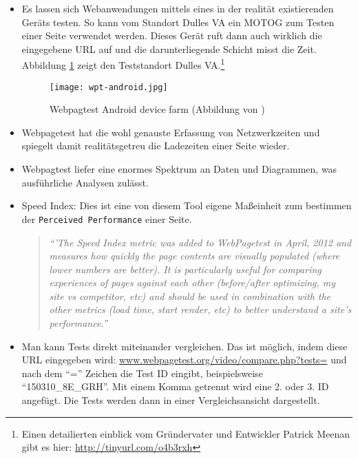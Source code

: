 			\begin{itemize}
				\item Es lassen sich Webanwendungen mittels eines in der realität existierenden Geräts testen. So kann vom Standort Dulles VA ein MOTOG zum Testen einer Seite verwendet werden. Dieses Gerät ruft dann auch wirklich die eingegebene URL auf und die darunterliegende Schicht misst die Zeit. Abbildung \ref{fig:wpt-android} zeigt den Teststandort Dulles VA.\footnote{Einen detailierten einblick vom Gründervater und Entwickler Patrick Meenan gibt es hier: \url{http://tinyurl.com/o4b3rxh}}

				\begin{figure}[htbp]
					\begin{center}
						\texttt{[image: wpt-android.jpg]}
						\caption{Webpagtest Android device farm (Abbildung von \autocite{meenan15})}
						\label{fig:wpt-android}
					\end{center}
				\end{figure}
				\item Webpagetest hat die wohl genauste Erfassung von Netzwerkzeiten und spiegelt damit realitätsgetreu die Ladezeiten einer Seite wieder.

				\item Webpagtest liefer eine enormes Spektrum an Daten und Diagrammen, was ausführliche Analysen zulässt.

				\item Speed Index: Dies ist eine von diesem Tool eigene Maßeinheit zum bestimmen der \texttt{Perceived Performance} einer Seite.

				\begin{quote}
					\textit{"`'The Speed Index metric was added to WebPagetest in April, 2012 and measures how quickly the page contents are visually populated (where lower numbers are better).  It is particularly useful for comparing experiences of pages against each other (before/after optimizing, my site vs competitor, etc) and should be used in combination with the other metrics (load time, start render, etc) to better understand a site's performance."'}\autocite{wegpagetestDocs}
				\end{quote}

				\item Man kann Tests direkt miteinander vergleichen. Das ist möglich, indem diese URL eingegeben wird: \url{www.webpagetest.org/video/compare.php?tests=} und nach dem "`="' Zeichen die Test ID eingibt, beispielsweise "`150310\_8E\_GRH"'.
				Mit einem Komma getrennt wird eine 2. oder 3. ID angefügt. Die Tests werden dann in einer Vergleichsansicht dargestellt.


\end{itemize}
